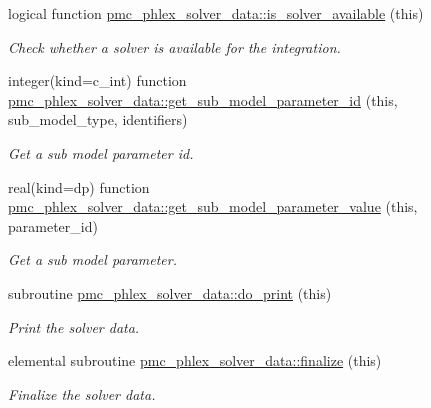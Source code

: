 \begin{DoxyCompactItemize}
logical function \mbox{\hyperlink{namespacepmc__phlex__solver__data_a74602731d9d435e9a16380c93bbc2073}{pmc\+\_\+phlex\+\_\+solver\+\_\+data\+::is\+\_\+solver\+\_\+available}} (this)
\begin{DoxyCompactList}\small\item\em Check whether a solver is available for the integration. \end{DoxyCompactList}\item 
integer(kind=c\+\_\+int) function \mbox{\hyperlink{namespacepmc__phlex__solver__data_a9af2b98e55136169b2ad7a82dbb14a0e}{pmc\+\_\+phlex\+\_\+solver\+\_\+data\+::get\+\_\+sub\+\_\+model\+\_\+parameter\+\_\+id}} (this, sub\+\_\+model\+\_\+type, identifiers)
\begin{DoxyCompactList}\small\item\em Get a sub model parameter id. \end{DoxyCompactList}\item 
real(kind=dp) function \mbox{\hyperlink{namespacepmc__phlex__solver__data_a01c236fc4f27615b63e278dee75bebf2}{pmc\+\_\+phlex\+\_\+solver\+\_\+data\+::get\+\_\+sub\+\_\+model\+\_\+parameter\+\_\+value}} (this, parameter\+\_\+id)
\begin{DoxyCompactList}\small\item\em Get a sub model parameter. \end{DoxyCompactList}\item 
subroutine \mbox{\hyperlink{namespacepmc__phlex__solver__data_a471de3023e1bb6f999905cc0870d37f5}{pmc\+\_\+phlex\+\_\+solver\+\_\+data\+::do\+\_\+print}} (this)
\begin{DoxyCompactList}\small\item\em Print the solver data. \end{DoxyCompactList}\item 
elemental subroutine \mbox{\hyperlink{namespacepmc__phlex__solver__data_afd20da14fccfdeabce1c2d4ffed4aec2}{pmc\+\_\+phlex\+\_\+solver\+\_\+data\+::finalize}} (this)
\begin{DoxyCompactList}\small\item\em Finalize the solver data. \end{DoxyCompactList}\end{DoxyCompactItemize}
